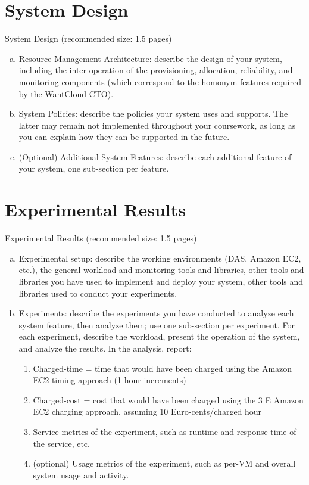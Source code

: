 \documentclass[twoside]{article}
\begin{document}
\begin{multicols}{2}

\section{System Design}
System Design (recommended size: 1.5 pages)
\begin{enumerate}[(a)]
\item Resource Management Architecture: describe the design of your system,
including the inter-operation of the provisioning, allocation, reliability, and monitoring components (which correspond to the homonym features required by the WantCloud CTO).
\item System Policies: describe the policies your system uses and supports. The latter may remain not implemented throughout your coursework, as long as you can explain how they can be supported in the future.
\item (Optional) Additional System Features: describe each additional feature of your system, one sub-section per feature.
\end{enumerate}


\section{Experimental Results}
Experimental Results (recommended size: 1.5 pages)
\begin{enumerate}[(a)]
\item Experimental setup: describe the working environments (DAS, Amazon EC2,
etc.), the general workload and monitoring tools and libraries, other tools and libraries you have used to implement and deploy your system, other tools and libraries used to conduct your experiments.
\item Experiments: describe the experiments you have conducted to analyze each system feature, then analyze them; use one sub-section per experiment. For each experiment, describe the workload, present the operation of the system, and analyze the results. In the analysis, report:
\begin{enumerate}
\item Charged-time = time that would have been charged using the Amazon EC2 timing approach (1-hour increments)
\item Charged-cost = cost that would have been charged using the 3
E
Amazon EC2 charging approach, assuming 10 Euro-cents/charged hour
\item Service metrics of the experiment, such as runtime and response time of
the service, etc.
\item (optional) Usage metrics of the experiment, such as per-VM and overall
system usage and activity.
\end{enumerate}
\end{enumerate}


\end{multicols}
\end{document}
